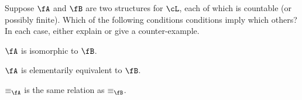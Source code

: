 \begin{problem}
  Suppose $\fA$ and $\fB$ are two structures for $\cL$, each of which is
  countable (or possibly finite).
  Which of the following conditions conditions imply which others?
  In each case, either explain or give a counter-example.
  \begin{enumroman}
    \item $\fA$ is isomorphic to $\fB$.
    \item $\fA$ is elementarily equivalent to $\fB$.
    \item $\equiv_\fA$ is the same relation as $\equiv_\fB$.
  \end{enumroman}
\end{problem}
\begin{Answer}
  
\end{Answer}
